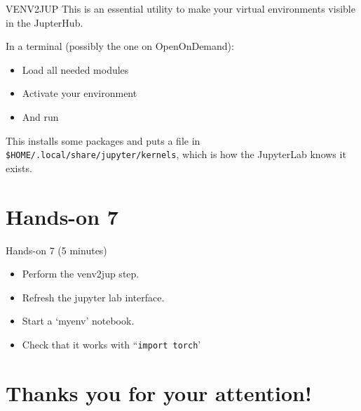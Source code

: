 \documentclass[
  10pt,
  ignorenonframetext,
  aspectratio=169]{beamer}
\newenvironment{Shaded}{\begin{snugshade}}{\end{snugshade}}
\newcommand{\ExtensionTok}[1]{\textcolor[rgb]{0.80,0.80,0.80}{#1}}
\newcommand{\KeywordTok}[1]{\textcolor[rgb]{0.94,0.87,0.69}{#1}}
\newcommand{\NormalTok}[1]{\textcolor[rgb]{0.80,0.80,0.80}{#1}}
\providecommand{\tightlist}{%
  \setlength{\itemsep}{0pt}\setlength{\parskip}{0pt}}
\begin{document}
\begin{frame}[fragile]{VENV2JUP}
\label{venv2jup}
This is an essential utility to make your virtual environments visible in the JupterHub.

In a terminal (possibly the one on OpenOnDemand):

\begin{itemize}
\item
  Load all needed modules

  \pause
\item
  Activate your environment

  \pause
\item
  And run
\end{itemize}

\begin{Shaded}
\end{Shaded}

This installs some packages and puts a file in \texttt{\$HOME/.local/share/jupyter/kernels}, which is how the JupyterLab knows it exists.
\end{frame}

\section{Hands-on 7}\label{hands-on-7}

\begin{frame}[fragile]{Hands-on 7 (5 minutes)}
\label{hands-on-7-5-minutes}
\begin{itemize}
\tightlist
\item
  Perform the venv2jup step.
\item
  Refresh the jupyter lab interface.
\item
  Start a `myenv' notebook.
\item
  Check that it works with ``\texttt{import\ torch}'
\end{itemize}
\end{frame}

\section{Thanks you for your attention!}\label{thanks-you-for-your-attention}
\end{document}
